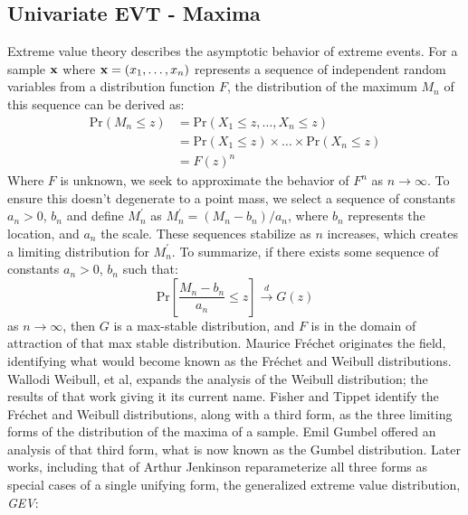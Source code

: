 \subsection{Univariate EVT - Maxima}
Extreme value theory describes the asymptotic behavior of extreme events.  For a sample ${\bf x}$
  where ${\bf x} = (x_1,\ldots,x_n)$ represents a sequence of independent random variables from a
  distribution function $F$, the distribution of the maximum $M_n$ of this sequence can be derived
  as:
  \begin{equation*}
    \begin{aligned}
      \text{Pr}(M_n\leq z) &= \text{Pr}(X_1 \leq z, \ldots, X_n \leq z)\\
        &= \text{Pr}(X_1\leq z)\times\ldots\times\text{Pr}(X_n\leq z)\\
        &= F(z)^n
    \end{aligned}
  \end{equation*}
  Where $F$ is unknown, we seek to approximate the behavior of $F^n$ as $n\rightarrow\infty$.  To
  ensure this doesn't degenerate to a point mass, we select a sequence of constants $a_n > 0$,
  $b_n$ and define $M_n^{\prime}$ as $M_n^{\prime} = (M_n - b_n)/a_n$, where $b_n$ represents the
  location, and $a_n$ the scale.  These sequences stabilize as $n$ increases, which creates a
  limiting distribution for $M_n^{\prime}$. To summarize, if there exists some sequence of
  constants $a_n > 0$, $b_n$ such that:
  \begin{equation*}
    \text{Pr}\left[\frac{M_n - b_n}{a_n} \leq z\right] \stackrel{d}{\rightarrow} G(z)
  \end{equation*}
  as $n\rightarrow\infty$, then $G$ is a max-stable distribution, and $F$ is in the domain of
  attraction of that max stable distribution.  Maurice Fr{\'e}chet\cite{frechet1927} originates the
  field, identifying what would become known as the Fr{\'e}chet and Weibull distributions.  Wallodi
  Weibull, et al, \cite{weibull1951} expands the analysis of the Weibull distribution; the results
  of that work giving it its current name.  Fisher and Tippet\cite{fisher1928} identify the Fr{\'e}chet
  and Weibull distributions, along with a third form, as the three limiting forms of the distribution
  of the maxima of a sample.  Emil Gumbel\cite{gumbel1935} offered an analysis of that third form,
  what is now known as the Gumbel distribution.  Later works, including that of Arthur
  Jenkinson\cite{jenkinson1955} reparameterize all three forms as special cases of a single unifying
  form, the generalized extreme value distribution, \emph{GEV}:
